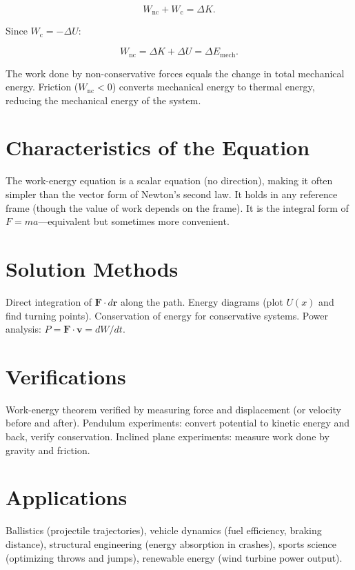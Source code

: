 \begin{equation}
W_{\text{nc}} + W_{\text{c}} = \Delta K.
\end{equation}

Since $W_{\text{c}} = -\Delta U$:

\begin{equation}
W_{\text{nc}} = \Delta K + \Delta U = \Delta E_{\text{mech}}.
\end{equation}

The work done by non-conservative forces equals the change in total mechanical energy. Friction ($W_{\text{nc}} < 0$) converts mechanical energy to thermal energy, reducing the mechanical energy of the system.

\section*{Characteristics of the Equation}

The work-energy equation is a scalar equation (no direction), making it often simpler than the vector form of Newton's second law. It holds in any reference frame (though the value of work depends on the frame). It is the integral form of $F = ma$---equivalent but sometimes more convenient.
\section*{Solution Methods}

Direct integration of $\mathbf{F} \cdot d\mathbf{r}$ along the path. Energy diagrams (plot $U(x)$ and find turning points). Conservation of energy for conservative systems. Power analysis: $P = \mathbf{F} \cdot \mathbf{v} = dW/dt$.
\section*{Verifications}

Work-energy theorem verified by measuring force and displacement (or velocity before and after). Pendulum experiments: convert potential to kinetic energy and back, verify conservation. Inclined plane experiments: measure work done by gravity and friction.
\section*{Applications}

Ballistics (projectile trajectories), vehicle dynamics (fuel efficiency, braking distance), structural engineering (energy absorption in crashes), sports science (optimizing throws and jumps), renewable energy (wind turbine power output).
